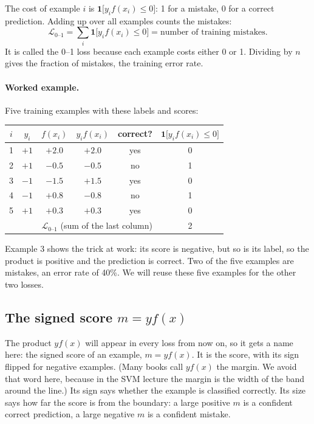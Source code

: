 \documentclass[11pt]{article}
\newcommand{\ind}[1]{\mathbf{1}\bigl[#1\bigr]}
\newcommand{\Loss}{\mathcal{L}}
\begin{document}
The cost of example $i$ is $\ind{y_i f(x_i) \le 0}$: 1 for a mistake, 0 for a correct prediction.
Adding up over all examples counts the mistakes:
\[
  \boxed{\;\Loss_{0\text{--}1} = \sum_i \ind{y_i f(x_i) \le 0} = \text{number of training mistakes.}\;}
\]
It is called the 0--1 loss because each example costs either 0 or 1. Dividing by $n$ gives the
fraction of mistakes, the training error rate.

\paragraph{Worked example.} Five training examples with these labels and scores:

\begin{center}
\begin{tabular}{cccccc}
  \toprule
  $i$ & $y_i$ & $f(x_i)$ & $y_i f(x_i)$ & correct? & $\ind{y_i f(x_i) \le 0}$ \\
  \midrule
  1 & $+1$ & $+2.0$ & $+2.0$ & yes & 0 \\
  2 & $+1$ & $-0.5$ & $-0.5$ & no  & 1 \\
  3 & $-1$ & $-1.5$ & $+1.5$ & yes & 0 \\
  4 & $-1$ & $+0.8$ & $-0.8$ & no  & 1 \\
  5 & $+1$ & $+0.3$ & $+0.3$ & yes & 0 \\
  \midrule
  \multicolumn{5}{r}{$\Loss_{0\text{--}1}$ (sum of the last column)} & 2 \\
  \bottomrule
\end{tabular}
\end{center}

Example 3 shows the trick at work: its score is negative, but so is its label, so the product is
positive and the prediction is correct. Two of the five examples are mistakes, an error rate of 40\%.
We will reuse these five examples for the other two losses.

\subsection{The signed score $m = y f(x)$}

The product $y f(x)$ will appear in every loss from now on, so it gets a name here: the signed score
of an example, $m = y f(x)$. It is the score, with its sign flipped for negative examples. (Many books
call $y f(x)$ the margin. We avoid that word here, because in the SVM lecture the margin is the width
of the band around the line.) Its sign says whether the example is classified correctly. Its size says how
far the score is from the boundary: a large positive $m$ is a confident correct prediction, a large
negative $m$ is a confident mistake.
\end{document}
